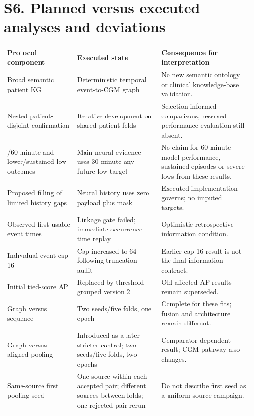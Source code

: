 \documentclass[11pt,a4paper]{article}
\begin{document}
\section*{S6. Planned versus executed analyses and deviations}
{\small
\setlength{\tabcolsep}{3pt}
\begin{longtable}{>{\raggedright\arraybackslash}p{}>{\raggedright\arraybackslash}p{}>{\raggedright\arraybackslash}p{}}
\toprule
\textbf{Protocol component} & \textbf{Executed state} & \textbf{Consequence for interpretation} \\ \midrule
\endhead
Broad semantic patient KG & Deterministic temporal event-to-CGM graph & No new semantic ontology or clinical knowledge-base validation. \\
Nested patient-disjoint confirmation & Iterative development on shared patient folds & Selection-informed comparisons; reserved performance evaluation still absent. \\
30/60-minute and lower/sustained-low outcomes & Main neural evidence uses 30-minute any-future-low target & No claim for 60-minute model performance, sustained episodes or severe lows from these results. \\
Proposed filling of limited history gaps & Neural history uses zero payload plus mask & Executed implementation governs; no imputed targets. \\
Observed first-usable event times & Linkage gate failed; immediate occurrence-time replay & Optimistic retrospective information condition. \\
Individual-event cap 16 & Cap increased to 64 following truncation audit & Earlier cap 16 result is not the final information contract. \\
Initial tied-score AP & Replaced by threshold-grouped version 2 & Old affected AP results remain superseded. \\
Graph versus sequence & Two seeds/five folds, one epoch & Complete for these fits; fusion and architecture remain different. \\
Graph versus aligned pooling & Introduced as a later stricter control; two seeds/five folds, two epochs & Comparator-dependent result; CGM pathway also changes. \\
Same-source first pooling seed & One source within each accepted pair; different sources between folds; one rejected pair rerun & Do not describe first seed as a uniform-source campaign. \\

\end{longtable}}
\end{document}
